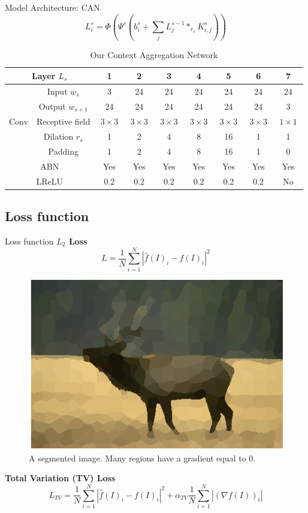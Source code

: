 \documentclass[9pt]{beamer}
\begin{document}
\begin{frame}{Model Architecture: CAN}
\begin{equation*}
    L_i^s=\Phi\left(\Psi^s\left(b_i^s+\sum_jL_j^{s-1}*_{r_s}K^s_{i,j}\right)\right)
\end{equation*}
\begin{table}[!ht]
    \centering\scriptsize
    \begin{tabular}{|c|c||c|cccc|cc|}
        \hline
        \multicolumn{2}{|c||}{Layer $L_s$} & 1 & 2 & 3 & 4 & 5 & 6 & 7 \\
        \hline
        \hline
         & Input $w_s$ & 3 & 24 & 24 & 24 & 24 & 24 & 24 \\
         & Output $w_{s+1}$ & 24 & 24 & 24 & 24 & 24 & 24 & 3 \\
        \cline{2-9}
        Conv & Receptive field & $\ 3\times 3\ $ & $\ 3\times 3\ $ & $\ 3\times 3\ $ & $\ 3\times 3\ $ & $\ 3\times 3\ $ & $\ 3\times 3\ $ & $\ 1\times 1\ $ \\
         & Dilation $r_s$ & 1 & 2 & 4 & 8 & 16 & 1 & 1 \\
         & Padding & 1 & 2 & 4 & 8 & 16 & 1 & 0 \\
        \hline
        \multicolumn{2}{|c||}{ABN} & Yes & Yes & Yes & Yes & Yes & Yes & Yes \\
        \hline
        \multicolumn{2}{|c||}{LReLU} & 0.2 & 0.2 & 0.2 & 0.2 & 0.2 & 0.2 & No \\
        \hline
    \end{tabular}
    \caption{Our Context Aggregation Network}
\end{table}

\end{frame}


\subsection{Loss function}
\begin{frame}{Loss function}
\vspace{5mm}
\textbf{$L_2$ Loss}
$$
L=\frac{1}{N}\sum_{i=1}^N |\hat{f}(I)_i-f(I)_i|^2
$$
\vspace{2mm}
\begin{figure}
\centering
\includegraphics[width=.4\textwidth]{pics/illustration1.png}
\caption{A segmented image. Many regions have a gradient equal to $0$.}
\end{figure}
\textbf{Total Variation (TV) Loss}
$$
L_{TV}=\frac{1}{N}\sum_{i=1}^N |\hat{f}(I)_i-f(I)_i|^2+\alpha_{TV}\frac{1}{N}\sum_{i=1}^N|(\nabla f(I))_i|
$$

\end{frame}
\end{document}
